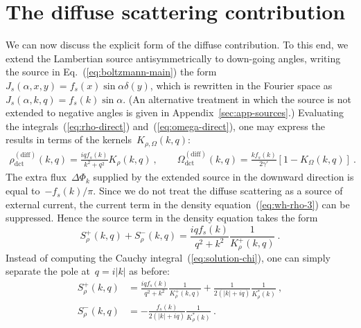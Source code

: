 \documentclass[preprint,aps,eqsecnum, prb]{revtex4-1}
\newcommand{\fplus}[1]{{#1}^{+}}
\newcommand{\fminus}[1]{{#1}^{-}}
\newcommand{\dct}[1]{{#1}_\mathrm{dct}}
\begin{document}


\section{The diffuse scattering contribution}
\label{sec:diffuse}

We can now discuss the explicit form of the diffuse contribution.
To this end, we extend the Lambertian
source antisymmetrically to down-going angles,
writing the source in Eq.~(\ref{eq:boltzmann-main}) the form
$J_{s}(\alpha, x, y) =  f_s(x) \sin\alpha \delta(y)$,
which is rewritten in the Fourier space
as~$J_{s}(\alpha, k, q) = f_s(k) \sin\alpha$.
(An alternative treatment in which the source is not extended 
to negative angles is given in Appendix~\ref{sec:app-sources}.)
Evaluating the integrals~(\ref{eq:rho-direct}) and~(\ref{eq:omega-direct}),
one may express the results in terms of the kernels~$K_{\rho, \Omega}(k, q)$:
\begin{align}
\dct{\rho}^\mathrm{(diff)}(k, q) = \frac{iq f_s(k)}{k^2 + q^2} K_\rho(k, q)\ ,
\qquad
\dct{\Omega}^\mathrm{(diff)}(k, q)
  = \frac{k f_s(k)}{2\gamma'} \left[1 - K_\Omega(k, q)\right] \ .
\end{align}
The extra flux~$\Delta\Phi_{k}$
supplied by the extended source in the downward direction
is equal to~$-f_s(k)/\pi$.
Since we do not treat the diffuse scattering as a source of external current,
the current term in the density equation~(\ref{eq:wh-rho-3}) can
be suppressed.
Hence the source term in the density equation takes the form
\begin{equation}
  \fplus{S}_\rho(k, q) + \fminus{S}_\rho(k, q) =
  \frac{iq f_s(k)}{q^2 + k^2} \frac{1}{\fplus{K}_\rho(k, q)}\ .
\end{equation}
Instead of computing the Cauchy integral~(\ref{eq:solution-chi}),
one can simply separate the pole at~$q = i|k|$ as before:
\begin{align}
  \fplus{S}_\rho(k, q) &= \frac{iq f_s(k)}{q^2 + k^2}
  \frac{1}{\fplus{K}_\rho(k, q)}
  + \frac{1}{2(|k| + iq)} \frac{1}{K_\rho^\ast(k)}\ , \\
  \fminus{S}_\rho(k, q) &= - \frac{f_s(k)}{2(|k| + iq)}
                          \frac{1}{K_\rho^\ast(k)}
  \ .
\end{align}
\end{document}
